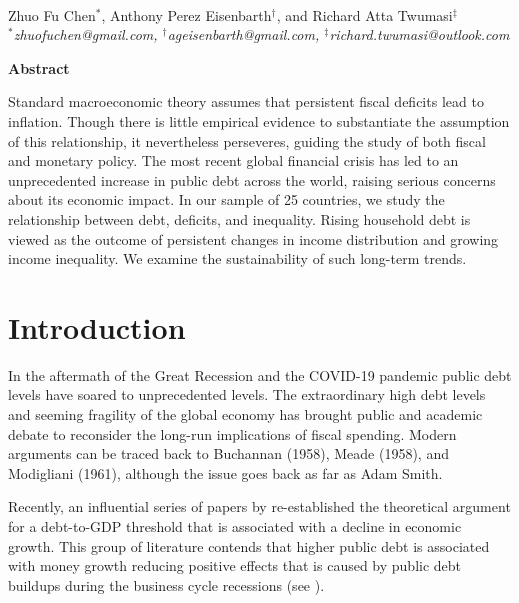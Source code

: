 \documentclass[12pt, titlepage]{article}
\date{}
\numberwithin{equation}{section}
\begin{document}
	\begin{titlepage}
		\centering
		\LARGE{}\\
		\vspace{5mm}
		\normalsize{Zhuo Fu Chen\(^\ast\), Anthony Perez Eisenbarth\(^\dagger\),
			and Richard Atta Twumasi\(^\ddagger\)}\\ \vspace{5mm}
		\textit{
			\vspace{1mm}
			\(^\ast\)zhuofuchen@gmail.com, \(^\dagger\)ageisenbarth@gmail.com, \(^\ddagger\)richard.twumasi@outlook.com
		}
	\begin{Center}
		\textbf{Abstract}
	\end{Center}
\justifying
Standard macroeconomic theory assumes that persistent fiscal deficits
lead to inflation. Though there is little empirical evidence to substantiate the
assumption of this relationship, it nevertheless perseveres, guiding the study
of both fiscal and monetary policy. The most recent global financial crisis
has led to an unprecedented increase in public debt across the world, raising
serious concerns about its economic impact. In our sample of 25 countries, we
study the relationship between debt, deficits, and inequality. Rising household
debt is viewed as the outcome of persistent changes in income distribution
and growing income inequality. We examine the sustainability of such long-term trends.
\end{titlepage}
	\tableofcontents 
	\cleardoublepage

\section{Introduction}

In the aftermath of the Great Recession and the COVID-19 pandemic public debt levels have soared to unprecedented levels. The extraordinary high debt levels and seeming fragility of the global economy has brought public and academic debate to reconsider the long-run implications of fiscal spending. Modern arguments can be traced back to Buchannan (1958), Meade (1958), and Modigliani (1961), although the issue goes back as far as Adam Smith.

Recently, an influential series of papers by \cite{Reinhart2010, Reinhart2011} re-established the theoretical argument for a debt-to-GDP threshold that is associated with a decline in economic growth. This group of literature contends that higher public debt is associated with money growth reducing positive effects that is caused by public debt buildups  during the business cycle recessions (see \citet{Reinhart2012, Romer2018}). 
\end{document}
